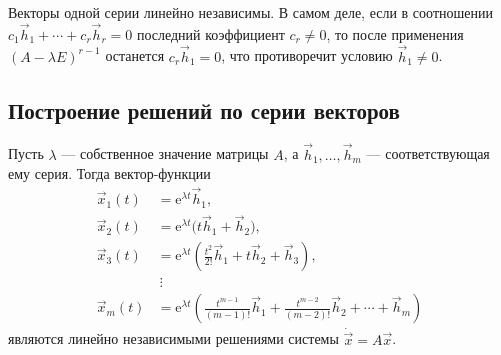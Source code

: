 \documentclass[12pt,a4paper]{article}
\numberwithin{equation}{section}
\newcommand{\vect}[1]{\vec{#1}}
\newcommand{\e}{\mathrm{e}}
\begin{document}
Векторы одной серии линейно независимы. В самом деле, если в соотношении
\(c_1\vect h_1+\cdots+c_r\vect h_r=0\) последний коэффициент \(c_r\ne0\),
то после применения \((A-\lambda E)^{r-1}\) останется \(c_r\vect h_1=0\),
что противоречит условию \(\vect h_1\ne0\).

\subsection{Построение решений по серии векторов}

\begin{theoremHSE}
Пусть $\lambda$ --- собственное значение матрицы $A$,
а $\vect h_1,\ldots,\vect h_m$ --- соответствующая ему серия.
Тогда вектор-функции
\[
\begin{aligned}
 \vect x_1(t)&=\e^{\lambda t}\vect h_1,\\
 \vect x_2(t)&=\e^{\lambda t}\bigl(t\vect h_1+\vect h_2\bigr),\\
 \vect x_3(t)&=\e^{\lambda t}\left(\frac{t^2}{2!}\vect h_1+t\vect h_2+\vect h_3\right),\\
 &\ \vdots\\
 \vect x_m(t)&=\e^{\lambda t}\left(
 \frac{t^{m-1}}{(m-1)!}\vect h_1+\frac{t^{m-2}}{(m-2)!}\vect h_2
 +\cdots+\vect h_m\right)
\end{aligned}
\]
являются линейно независимыми решениями системы $\dot{\vect x}=A\vect x$.

\end{theoremHSE}
\end{document}
